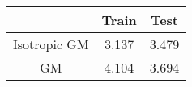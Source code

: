 \begin{tabular}{|c|c|c|}
   \midrule
 & Train & Test \\ 
   \midrule
Isotropic GM & 3.137 & 3.479 \\ 
  GM & 4.104 & 3.694 \\ 
   \bottomrule
\end{tabular}
